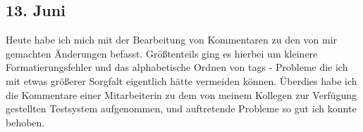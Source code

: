 \subsection{13. Juni}
Heute habe ich mich mit der Bearbeitung von Kommentaren zu den von mir gemachten Änderungen befasst. Größtenteils ging es hierbei um kleinere Formatierungsfehler und das alphabetische Ordnen von tags - Probleme die ich mit etwas größerer Sorgfalt eigentlich hätte vermeiden können. Überdies habe ich die Kommentare einer Mitarbeiterin zu dem von meinem Kollegen zur Verfügung gestellten Testsystem aufgenommen, und auftretende Probleme so gut ich konnte behoben.